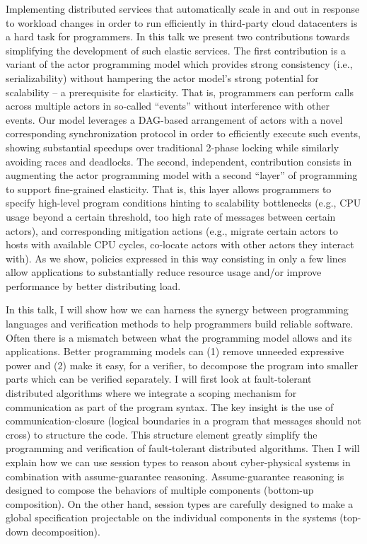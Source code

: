 \documentclass[a4paper,UKenglish]{dagrep-v2018}
\begin{document}
Implementing distributed services that automatically scale in and out in response to workload changes in order to run efficiently in third-party cloud datacenters is a hard task for programmers. In this talk we present two contributions towards simplifying the development of such elastic services. The first contribution is a variant of the actor programming model which provides strong consistency (i.e., serializability) without hampering the actor model’s strong potential for scalability -- a prerequisite for elasticity. That is, programmers can perform calls across multiple actors in so-called “events” without interference with other events. Our model leverages a DAG-based arrangement of actors with a novel corresponding synchronization protocol  in order to efficiently execute such events, showing substantial speedups over traditional 2-phase locking while similarly avoiding races and deadlocks. The second, independent, contribution consists in augmenting the actor programming model with a second “layer” of programming to support fine-grained elasticity. That is, this layer allows programmers to specify high-level program conditions hinting to scalability bottlenecks (e.g., CPU usage beyond a certain threshold, too high rate of messages between certain actors), and corresponding mitigation actions (e.g., migrate certain actors to hosts with available CPU cycles, co-locate actors with other actors they interact with). As we show, policies expressed in this way consisting in only a few lines allow applications to substantially reduce resource usage and/or improve performance by better distributing load.


\license

In this talk, I will show how we can harness the synergy between programming languages and verification methods to help programmers build
reliable software. Often there is a mismatch between what the programming model allows and its applications. Better programming models can (1) remove unneeded expressive power and (2) make it easy, for a verifier, to decompose the program into smaller parts which can be verified separately. I will first look at fault-tolerant distributed algorithms where we integrate a scoping mechanism for communication as part of the program syntax.  The key insight is the use of communication-closure (logical boundaries in a program that messages should not cross) to structure the code. This structure element greatly simplify the programming and verification of fault-tolerant distributed algorithms. Then I will explain how we can use session types to reason about cyber-physical systems in combination with assume-guarantee reasoning. Assume-guarantee reasoning is designed to compose the behaviors of multiple components (bottom-up composition). On the other hand, session types are carefully designed to make a global specification projectable on the individual components in the systems (top-down decomposition).
\end{document}
